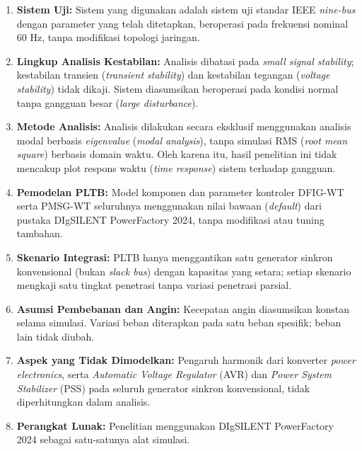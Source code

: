 \begin{enumerate}
	\item \textbf{Sistem Uji:} Sistem yang digunakan adalah sistem uji standar
	IEEE \textit{nine-bus} dengan parameter yang telah ditetapkan, beroperasi
	pada frekuensi nominal 60 Hz, tanpa modifikasi topologi jaringan.
	\item \textbf{Lingkup Analisis Kestabilan:} Analisis dibatasi pada
	\textit{small signal stability}; kestabilan transien (\textit{transient
	stability}) dan kestabilan tegangan (\textit{voltage stability}) tidak
	dikaji. Sistem diasumsikan beroperasi pada kondisi normal tanpa gangguan
	besar (\textit{large disturbance}).
	\item \textbf{Metode Analisis:} Analisis dilakukan secara eksklusif
	menggunakan analisis modal berbasis \textit{eigenvalue} (\textit{modal
	analysis}), tanpa simulasi RMS (\textit{root mean square}) berbasis
	domain waktu. Oleh karena itu, hasil penelitian ini tidak mencakup plot
	respons waktu (\textit{time response}) sistem terhadap gangguan.
	\item \textbf{Pemodelan PLTB:} Model komponen dan parameter kontroler
	DFIG-WT serta PMSG-WT seluruhnya menggunakan nilai bawaan
	(\textit{default}) dari pustaka DIgSILENT PowerFactory 2024, tanpa
	modifikasi atau tuning tambahan.
	\item \textbf{Skenario Integrasi:} PLTB hanya menggantikan satu generator
	sinkron konvensional (bukan \textit{slack bus}) dengan kapasitas yang
	setara; setiap skenario mengkaji satu tingkat penetrasi tanpa variasi
	penetrasi parsial.
	\item \textbf{Asumsi Pembebanan dan Angin:} Kecepatan angin diasumsikan
	konstan selama simulasi. Variasi beban diterapkan pada satu beban spesifik;
	beban lain tidak diubah.
	\item \textbf{Aspek yang Tidak Dimodelkan:} Pengaruh harmonik dari
	konverter \textit{power electronics}, serta \textit{Automatic Voltage
	Regulator} (AVR) dan \textit{Power System Stabilizer} (PSS) pada seluruh
	generator sinkron konvensional, tidak diperhitungkan dalam analisis.
	\item \textbf{Perangkat Lunak:} Penelitian menggunakan DIgSILENT
	PowerFactory 2024 sebagai satu-satunya alat simulasi.
\end{enumerate}


